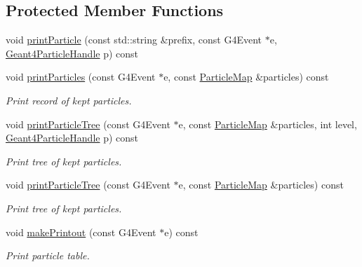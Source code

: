 \subsection*{Protected Member Functions}
\begin{DoxyCompactItemize}
\item 
void \hyperlink{class_d_d4hep_1_1_simulation_1_1_geant4_particle_print_a863c1f3d373bd9f588ce2eb2e54cc289}{printParticle} (const std::string \&prefix, const G4Event $\ast$e, \hyperlink{class_d_d4hep_1_1_simulation_1_1_geant4_particle_handle}{Geant4ParticleHandle} p) const 
\item 
void \hyperlink{class_d_d4hep_1_1_simulation_1_1_geant4_particle_print_a674a1bd5268f594db4ef4a2697df6813}{printParticles} (const G4Event $\ast$e, const \hyperlink{class_d_d4hep_1_1_simulation_1_1_geant4_particle_print_a1c6a9ccb9393484ee16c7cd344e20f4a}{ParticleMap} \&particles) const 
\begin{DoxyCompactList}\small\item\em Print record of kept particles. \item\end{DoxyCompactList}\item 
void \hyperlink{class_d_d4hep_1_1_simulation_1_1_geant4_particle_print_af53abc4bb399b2484761613a360b4063}{printParticleTree} (const G4Event $\ast$e, const \hyperlink{class_d_d4hep_1_1_simulation_1_1_geant4_particle_print_a1c6a9ccb9393484ee16c7cd344e20f4a}{ParticleMap} \&particles, int level, \hyperlink{class_d_d4hep_1_1_simulation_1_1_geant4_particle_handle}{Geant4ParticleHandle} p) const 
\begin{DoxyCompactList}\small\item\em Print tree of kept particles. \item\end{DoxyCompactList}\item 
void \hyperlink{class_d_d4hep_1_1_simulation_1_1_geant4_particle_print_a65b769e2ac95c58da7905668ece79987}{printParticleTree} (const G4Event $\ast$e, const \hyperlink{class_d_d4hep_1_1_simulation_1_1_geant4_particle_print_a1c6a9ccb9393484ee16c7cd344e20f4a}{ParticleMap} \&particles) const 
\begin{DoxyCompactList}\small\item\em Print tree of kept particles. \item\end{DoxyCompactList}\item 
void \hyperlink{class_d_d4hep_1_1_simulation_1_1_geant4_particle_print_af16e29a3fd130065639828fc51bc6fc6}{makePrintout} (const G4Event $\ast$e) const 
\begin{DoxyCompactList}\small\item\em Print particle table. \item\end{DoxyCompactList}\end{DoxyCompactItemize}
